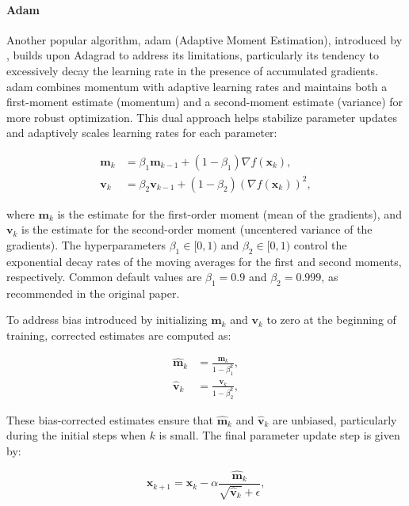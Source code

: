 \paragraph{Adam}
\label{paragraph:adam}
Another popular algorithm, \ac{adam} (Adaptive Moment Estimation), introduced by \citet{kingma2014adam}, builds upon Adagrad to address its limitations, particularly its tendency to excessively decay the learning rate in the presence of accumulated gradients. \ac{adam} combines momentum with adaptive learning rates and maintains both a first-moment estimate (momentum) and a second-moment estimate (variance) for more robust optimization. This dual approach helps stabilize parameter updates and adaptively scales learning rates for each parameter:

\begin{align*}
\mathbf{m}_k &= \beta_1 \mathbf{m}_{k-1} + (1 - \beta_1) \nabla f(\mathbf{x}_k), \\  
\mathbf{v}_k &= \beta_2 \mathbf{v}_{k-1} + (1 - \beta_2) (\nabla f(\mathbf{x}_k))^2,
\end{align*}

\noindent where $\mathbf{m}_k$ is the estimate for the first-order moment (mean of the gradients), and $\mathbf{v}_k$ is the estimate for the second-order moment (uncentered variance of the gradients). The hyperparameters $\beta_1 \in [0, 1)$ and $\beta_2 \in [0, 1)$ control the exponential decay rates of the moving averages for the first and second moments, respectively. Common default values are $\beta_1 = 0.9$ and $\beta_2 = 0.999$, as recommended in the original paper. 

To address bias introduced by initializing $\mathbf{m}_k$ and $\mathbf{v}_k$ to zero at the beginning of training, corrected estimates are computed as:

\begin{align*}
    \hat{\mathbf{m}}_k &= \frac{\mathbf{m}_k}{1-\beta_1^k}, \\  
    \hat{\mathbf{v}}_k &= \frac{\mathbf{v}_k}{1-\beta_2^k},
\end{align*}

\noindent These bias-corrected estimates ensure that $\hat{\mathbf{m}}_k$ and $\hat{\mathbf{v}}_k$ are unbiased, particularly during the initial steps when $k$ is small. The final parameter update step is given by:

\begin{equation*}
\mathbf{x}_{k+1} = \mathbf{x}_k - \alpha \frac{\hat{\mathbf{m}}_k}{\sqrt{\hat{\mathbf{v}}_k} + \epsilon},
\end{equation*}

